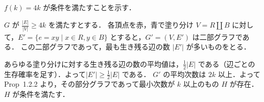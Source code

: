\subsection{}
$f(k) = 4k$ が条件を満たすことを示す．

$G$ が $\frac{|E|}{|V|} \geq 4k$ を満たすとする．
各頂点を赤，青で塗り分け $V = R\amalg B$ に対して，$E' = \{e = xy\mid x\in R, y\in B\}$ とすると，$G' = (V, E')$ は二部グラフである．
この二部グラフであって，最も生き残る辺の数 $|E'|$ が多いものをとる．

あらゆる塗り分けに対する生き残る辺の数の平均値は，$\frac12 |E|$ である（辺ごとの生存確率を足す）．よって$|E'| \geq \frac12 |E|$ である．
$G'$ の平均次数は $2k$ 以上．よって Prop~1.2.2 より，その部分グラフであって最小次数が $k$ 以上のもの $H$ が存在．$H$ が条件を満たす．

 